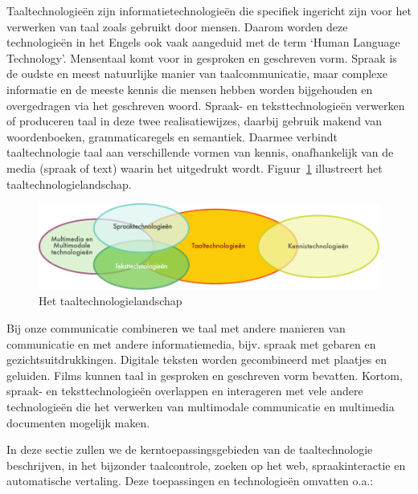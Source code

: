 \documentclass[]{../../metanetpaper}
\begin{document}
\begin{multicols}{2}
    Taaltechnologie{\"e}n zijn informatietechnologie{\"e}n die specifiek ingericht zijn voor het verwerken van taal zoals gebruikt door mensen. Daarom worden deze technologie{\"e}n in het Engels ook vaak aangeduid met de term `Human Language Technology'. Mensentaal komt voor in gesproken en geschreven vorm. Spraak is de oudste en meest natuurlijke manier van taalcommunicatie, maar complexe informatie en de meeste kennis die mensen hebben worden bijgehouden en overgedragen via het geschreven woord. Spraak- en teksttechnologie{\"e}n verwerken of produceren taal in deze twee realisatiewijzes, daarbij gebruik makend van woordenboeken,  grammaticaregels en semantiek. Daarmee verbindt taaltechnologie taal aan verschillende vormen van kennis, onafhankelijk van de media (spraak of text) waarin het uitgedrukt wordt. Figuur~\ref{fig:ltincontext_nl} illustreert het taaltechnologielandschap.


\begin{figure}[htb]
  \center
  \includegraphics[width=\textwidth]{../_media/dutch/language_technologies}
  \caption{Het taaltechnologielandschap}
  \label{fig:ltincontext_nl}
\end{figure}


Bij onze communicatie combineren we taal met andere manieren van communicatie en met andere informatiemedia, bijv. spraak met gebaren en gezichtsuitdrukkingen. Digitale teksten worden gecombineerd met plaatjes en geluiden. Films kunnen taal in gesproken en geschreven vorm bevatten. Kortom,  spraak- en teksttechnologie{\"e}n overlappen en interageren  met vele andere technologie{\"e}n die het verwerken van multimodale communicatie en multimedia documenten mogelijk maken.


In deze  sectie zullen we de kerntoepassingsgebieden van de taaltechnologie beschrijven, in het bijzonder taalcontrole, zoeken op het web, spraakinteractie en automatische vertaling. Deze toepassingen en technologie{\"e}n omvatten o.a.:


\end{multicols}
\end{document}
